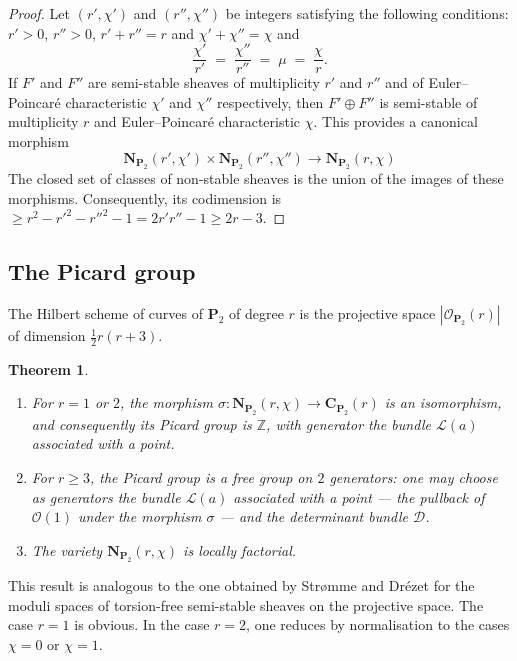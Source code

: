 \documentclass[12pt,english]{smfart}%
\theoremstyle{plain}
\newtheorem{theorem}{Theorem}[section]
\theoremstyle{definition}
\theoremstyle{remark}
\newcommand{\PP}{\mathbf{P}}
\newcommand{\ZZ}{\mathbb{Z}}
\newcommand{\Oh}{\mathcal{O}}
\newcommand{\origpage}[1]{\marginnote{\scriptsize\itshape p.~#1}}
\begin{document}
\begin{proof}
Let $(r',\chi')$ and $(r'',\chi'')$ be integers satisfying the following conditions: $r'>0$, $r''>0$, $r'+r''=r$ and $\chi'+\chi''=\chi$ and
\[
\frac{\chi'}{r'} \;=\; \frac{\chi''}{r''} \;=\; \mu \;=\; \frac{\chi}{r}.
\]
If $F'$ and $F''$ are semi-stable sheaves of multiplicity $r'$ and $r''$ and of Euler--Poincar\'e characteristic $\chi'$ and $\chi''$ respectively, then $F'\oplus F''$ is semi-stable of multiplicity $r$ and Euler--Poincar\'e characteristic $\chi$. This provides a canonical morphism
\[
\mathbf{N}_{\PP_{2}}(r',\chi') \times \mathbf{N}_{\PP_{2}}(r'',\chi'')
\longrightarrow \mathbf{N}_{\PP_{2}}(r,\chi)
\]
The closed set of classes of non-stable sheaves is the union of the images of these morphisms. Consequently, its codimension is $\geq r^{2}-r'^{2}-r''^{2}-1 = 2r'r''-1 \geq 2r-3$.
\end{proof}

\subsection{The Picard group}\label{subsec:picard}

The Hilbert scheme of curves of $\PP_{2}$ of degree $r$ is the projective space $|\Oh_{\PP_{2}}(r)|$ of dimension $\tfrac{1}{2}r(r+3)$.

\origpage{646}
\begin{theorem}\label{thm:picard}
\begin{enumerate}
\item For $r=1$ or $2$, the morphism $\sigma:\mathbf{N}_{\PP_{2}}(r,\chi)\to\mathbf{C}_{\PP_{2}}(r)$ is an isomorphism, and consequently its Picard group is $\ZZ$, with generator the bundle $\mathscr{L}(a)$ associated with a point.
\item For $r\geq 3$, the Picard group is a free group on $2$ generators: one may choose as generators the bundle $\mathscr{L}(a)$ associated with a point --- the pullback of $\Oh(1)$ under the morphism $\sigma$ --- and the determinant bundle $\mathscr{D}$.
\item The variety $\mathbf{N}_{\PP_{2}}(r,\chi)$ is locally factorial.
\end{enumerate}
\end{theorem}

This result is analogous to the one obtained by Str\o mme \cite{Str} and Dr\'ezet \cite{Dre1} for the moduli spaces of torsion-free semi-stable sheaves on the projective space. The case $r=1$ is obvious. In the case $r=2$, one reduces by normalisation to the cases $\chi=0$ or $\chi=1$.
\end{document}
